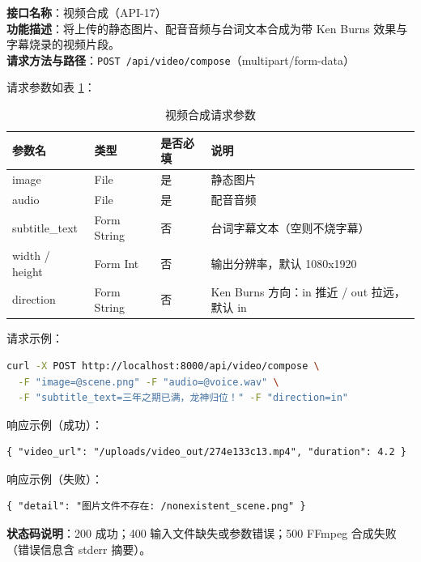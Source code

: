 \documentclass[12pt]{ctexrep}
\begin{document}
\textbf{接口名称}：视频合成（API-17）\\
\textbf{功能描述}：将上传的静态图片、配音音频与台词文本合成为带 Ken Burns 效果与字幕烧录的视频片段。\\
\textbf{请求方法与路径}：\texttt{POST /api/video/compose}（multipart/form-data）

请求参数如表 \ref{tab:compose-params}：

\begin{table}[htbp]
\centering
\begin{tabular}{p{3.2cm}p{2.6cm}p{2.2cm}p{6.4cm}}
\toprule
参数名 & 类型 & 是否必填 & 说明\\
\midrule
image & File & 是 & 静态图片\\
audio & File & 是 & 配音音频\\
subtitle\_text & Form String & 否 & 台词字幕文本（空则不烧字幕）\\
width / height & Form Int & 否 & 输出分辨率，默认 1080x1920\\
direction & Form String & 否 & Ken Burns 方向：in 推近 / out 拉远，默认 in\\
\bottomrule
\end{tabular}
\caption{视频合成请求参数}\label{tab:compose-params}
\end{table}

请求示例：

\begin{lstlisting}[language=bash,caption={视频合成请求示例},label=lst:compose]
curl -X POST http://localhost:8000/api/video/compose \
  -F "image=@scene.png" -F "audio=@voice.wav" \
  -F "subtitle_text=三年之期已满，龙神归位！" -F "direction=in"
\end{lstlisting}

响应示例（成功）：

\begin{lstlisting}[caption={视频合成成功响应},label=lst:compose-ok]
{ "video_url": "/uploads/video_out/274e133c13.mp4", "duration": 4.2 }
\end{lstlisting}

响应示例（失败）：

\begin{lstlisting}[caption={视频合成失败响应},label=lst:compose-fail]
{ "detail": "图片文件不存在: /nonexistent_scene.png" }
\end{lstlisting}

\textbf{状态码说明}：200 成功；400 输入文件缺失或参数错误；500 FFmpeg 合成失败（错误信息含 stderr 摘要）。
\end{document}
